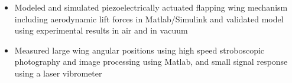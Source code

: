 	\begin{itemize}[leftmargin = \itemmargin]
	\item Modeled and simulated piezoelectrically actuated flapping wing mechanism including aerodynamic lift forces in Matlab/Simulink and validated model using experimental results in air and in vacuum
	\item Measured large wing angular positions using high speed stroboscopic photography and image processing using Matlab, and small signal response using a laser vibrometer
	\end{itemize} 
